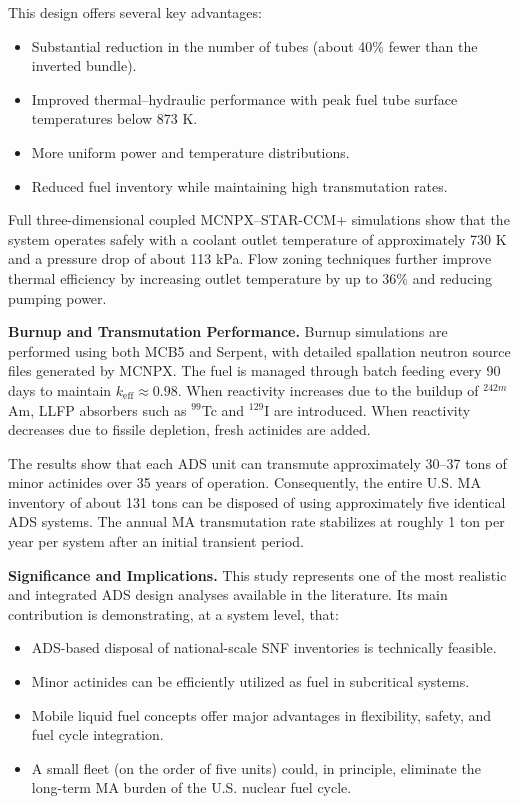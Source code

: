 This design offers several key advantages:
\begin{itemize}
    \item Substantial reduction in the number of tubes (about 40\% fewer than the inverted bundle).
    \item Improved thermal--hydraulic performance with peak fuel tube surface temperatures below 873 K.
    \item More uniform power and temperature distributions.
    \item Reduced fuel inventory while maintaining high transmutation rates.
\end{itemize}

Full three-dimensional coupled MCNPX--STAR-CCM+ simulations show that the system operates safely with a coolant outlet 
temperature of approximately 730 K and a pressure drop of about 113 kPa. Flow zoning techniques further improve thermal 
efficiency by increasing outlet temperature by up to 36\% and reducing pumping power.

\textbf{Burnup and Transmutation Performance.}  
Burnup simulations are performed using both MCB5 and Serpent, with detailed spallation neutron source files generated by MCNPX. 
The fuel is managed through batch feeding every 90 days to maintain $k_{\text{eff}} \approx 0.98$. When reactivity increases 
due to the buildup of $^{242m}$Am, LLFP absorbers such as $^{99}$Tc and $^{129}$I are introduced. When reactivity decreases 
due to fissile depletion, fresh actinides are added.

The results show that each ADS unit can transmute approximately 30--37 tons of minor actinides over 35 years of operation. 
Consequently, the entire U.S. MA inventory of about 131 tons can be disposed of using approximately five identical ADS systems. 
The annual MA transmutation rate stabilizes at roughly 1 ton per year per system after an initial transient period.

\textbf{Significance and Implications.}  
This study represents one of the most realistic and integrated ADS design analyses available in the literature. Its main 
contribution is demonstrating, at a system level, that:
\begin{itemize}
    \item ADS-based disposal of national-scale SNF inventories is technically feasible.
    \item Minor actinides can be efficiently utilized as fuel in subcritical systems.
    \item Mobile liquid fuel concepts offer major advantages in flexibility, safety, and fuel cycle integration.
    \item A small fleet (on the order of five units) could, in principle, eliminate the long-term MA burden of the U.S. 
    nuclear fuel cycle.
\end{itemize}

